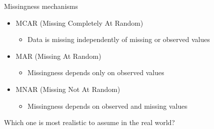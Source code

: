 \documentclass[11pt,compress,t,notes=noshow, xcolor=table]{beamer}
\begin{document}
\begin{frame}{Missingness mechanisms}
    \vfill
    \begin{itemize}
        \item MCAR (Missing Completely At Random)
        \begin{itemize}
            \item Data is missing independently of missing or observed values
        \end{itemize}
        \item MAR (Missing At Random)
        \begin{itemize}
            \item Missingness depends only on observed values
        \end{itemize}
        \item MNAR (Missing Not At Random)
        \begin{itemize}
            \item Missingness depends on observed and missing values
        \end{itemize}
    \end{itemize}    
    \vfill
    \pause
    Which one is most realistic to assume in the real world?
    \vfill
\end{frame}
\end{document}
